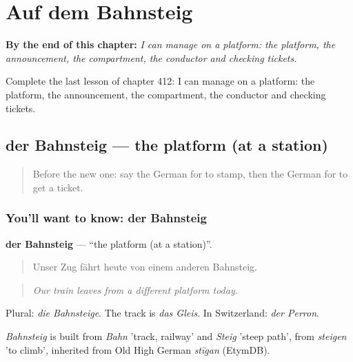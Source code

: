 
\chapter{Auf dem Bahnsteig}
\label{ch:ge-auf-dem-bahnsteig}

\begin{chapteropening}
\textbf{By the end of this chapter:} \emph{I can manage on a platform: the platform, the announcement, the compartment, the conductor and checking tickets.}

Complete the last lesson of chapter 412: I can manage on a platform: the platform, the announcement, the compartment, the conductor and checking tickets.
\end{chapteropening}

\section[der Bahnsteig]{der Bahnsteig — the platform (at a station)}

\label{lesson:GE-C412-bahnsteig}



\begin{quote}
Before the new one: say the German for to stamp, then the German for to get a ticket.
\end{quote}

\subsection*{You'll want to know: der Bahnsteig}
\textbf{der Bahnsteig} — \textquotedblleft{}the platform (at a station)\textquotedblright{}.

\begin{quote}
Unser Zug fährt heute von einem anderen Bahnsteig.
\end{quote}

\begin{quote}
\emph{Our train leaves from a different platform today.}
\end{quote}

Plural: \emph{die Bahnsteige}. The track is \emph{das Gleis}. In Switzerland: \emph{der Perron}.

\begin{cousinweb}
\emph{Bahnsteig} is built from \emph{Bahn} 'track, railway' and \emph{Steig} 'steep path', from \emph{steigen} 'to climb', inherited from Old High German \emph{stīgan} (EtymDB).
\end{cousinweb}

